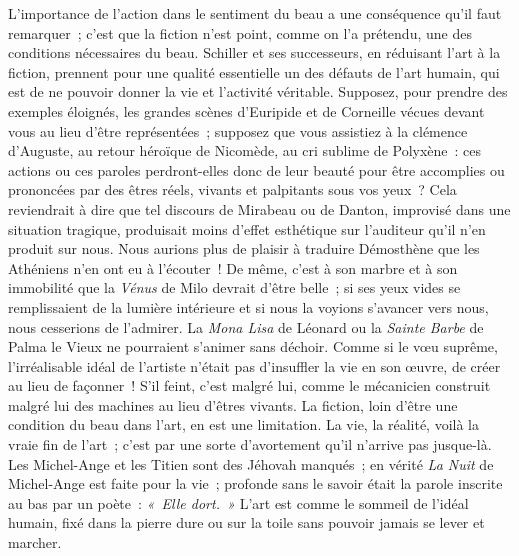 \documentclass[french,twoside]{book} %
\begin{document}
L’importance de l’action dans le sentiment du beau a une conséquence qu’il faut remarquer ; c’est que la fiction n’est point, comme on l’a prétendu, une des conditions  nécessaires du beau. Schiller et ses successeurs, en réduisant l’art à la fiction, prennent pour une qualité essentielle un des défauts de l’art humain, qui est de ne pouvoir donner la vie et l’activité véritable. Supposez, pour prendre des exemples éloignés, les grandes scènes d’Euripide et de Corneille vécues devant vous au lieu d’être représentées ; supposez que vous assistiez à la clémence d’Auguste, au retour héroïque de Nicomède, au cri sublime de Polyxène : ces actions ou ces paroles perdront-elles donc de leur beauté pour être accomplies ou prononcées par des êtres réels, vivants et palpitants sous vos yeux ? Cela reviendrait à dire que tel discours de Mirabeau ou de Danton, improvisé dans une situation tragique, produisait moins d’effet esthétique sur l’auditeur qu’il n’en produit sur nous. Nous aurions plus de plaisir à traduire Démosthène que les Athéniens n’en ont eu à l’écouter ! De même, c’est à son marbre et à son immobilité que la \emph{Vénus} de Milo devrait d’être belle ; si ses yeux vides se remplissaient de la lumière intérieure et si nous la voyions s’avancer vers nous, nous cesserions de l’admirer. La \emph{Mona Lisa} de Léonard ou la \emph{Sainte Barbe} de Palma le Vieux ne pourraient s’animer sans déchoir. Comme si le vœu suprême, l’irréalisable idéal de l’artiste n’était pas d’insuffler la vie en son œuvre, de créer au lieu de façonner ! S’il feint, c’est malgré lui, comme le mécanicien construit malgré lui des machines au lieu d’êtres vivants. La fiction, loin d’être une condition du beau dans l’art, en est une limitation. La vie, la réalité, voilà la vraie fin de l’art ; c’est par une sorte d’avortement qu’il n’arrive pas jusque-là. Les Michel-Ange  et les Titien sont des Jéhovah manqués ; en vérité {\itshape La Nuit} de Michel-Ange est faite pour la vie ; profonde sans le savoir était la parole inscrite au bas par un poète : \emph{« Elle dort. »} L’art est comme le sommeil de l’idéal humain, fixé dans la pierre dure ou sur la toile sans pouvoir jamais se lever et marcher.\par
\end{document}

